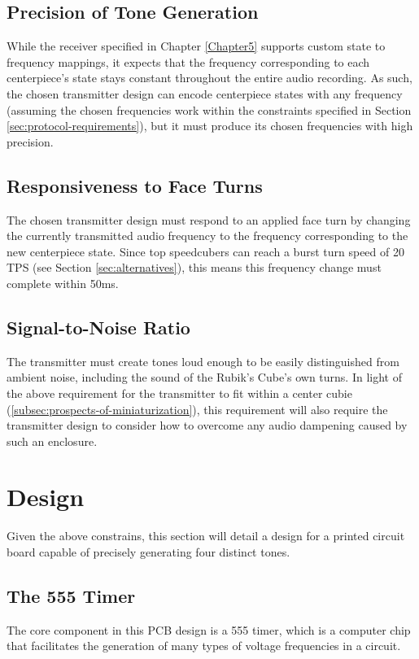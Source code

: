 \subsection{Precision of Tone Generation}
\label{subsec:precision-of-tone-generation}
While the receiver specified in Chapter \ref{Chapter5} supports custom state to frequency mappings, it expects that the frequency corresponding to each centerpiece's state stays constant throughout the entire audio recording.
As such, the chosen transmitter design can encode centerpiece states with any frequency (assuming the chosen frequencies work within the constraints specified in Section \ref{sec:protocol-requirements}), but it must produce its chosen frequencies with high precision.

\subsection{Responsiveness to Face Turns}
\label{subsec:responsiveness-to-face-turns}
The chosen transmitter design must respond to an applied face turn by changing the currently transmitted audio frequency to the frequency corresponding to the new centerpiece state.
Since top speedcubers can reach a burst turn speed of 20 TPS (see Section \ref{sec:alternatives}), this means this frequency change must complete within 50ms.

\subsection{Signal-to-Noise Ratio}
\label{subsec:transmitter-signal-to-noise-ratio}
The transmitter must create tones loud enough to be easily distinguished from ambient noise, including the sound of the Rubik's Cube's own turns.
In light of the above requirement for the transmitter to fit within a center cubie (\ref{subsec:prospects-of-miniaturization}), this requirement will also require the transmitter design to consider how to overcome any audio dampening caused by such an enclosure.


\newpage
\section{Design}
\label{sec:transmitter-design}
Given the above constrains, this section will detail a design for a printed circuit board capable of precisely generating four distinct tones.

\subsection{The 555 Timer}
\label{sec:the-555-timer}
The core component in this PCB design is a 555 timer, which is a computer chip that facilitates the generation of many types of voltage frequencies in a circuit.

